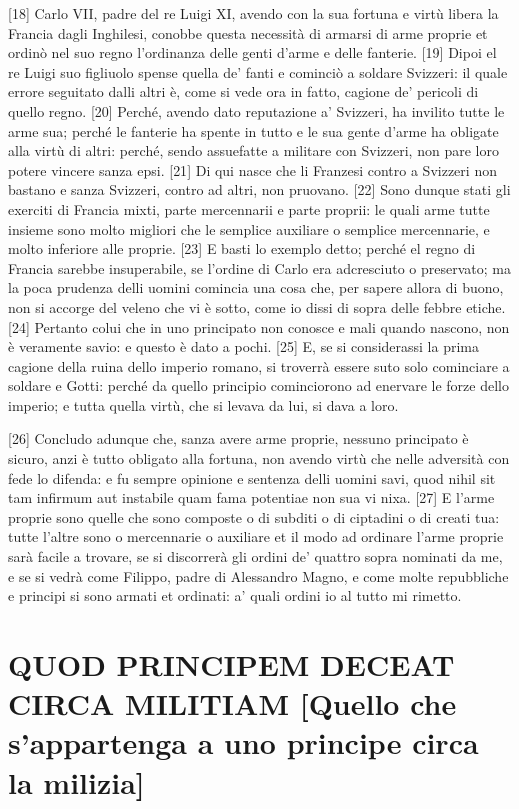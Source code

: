 {[}18{]} Carlo VII, padre del re Luigi XI, avendo con la sua fortuna e
virtù libera la Francia dagli Inghilesi, conobbe questa necessità di
armarsi di arme proprie et ordinò nel suo regno l'ordinanza delle genti
d'arme e delle fanterie. {[}19{]} Dipoi el re Luigi suo figliuolo spense
quella de' fanti e cominciò a soldare Svizzeri: il quale errore
seguitato dalli altri è, come si vede ora in fatto, cagione de' pericoli
di quello regno. {[}20{]} Perché, avendo dato reputazione a' Svizzeri,
ha invilito tutte le arme sua; perché le fanterie ha spente in tutto e
le sua gente d'arme ha obligate alla virtù di altri: perché, sendo
assuefatte a militare con Svizzeri, non pare loro potere vincere sanza
epsi. {[}21{]} Di qui nasce che li Franzesi contro a Svizzeri non
bastano e sanza Svizzeri, contro ad altri, non pruovano. {[}22{]} Sono
dunque stati gli exerciti di Francia mixti, parte mercennarii e parte
proprii: le quali arme tutte insieme sono molto migliori che le semplice
auxiliare o semplice mercennarie, e molto inferiore alle proprie.
{[}23{]} E basti lo exemplo detto; perché el regno di Francia sarebbe
insuperabile, se l'ordine di Carlo era adcresciuto o preservato; ma la
poca prudenza delli uomini comincia una cosa che, per sapere allora di
buono, non si accorge del veleno che vi è sotto, come io dissi di sopra
delle febbre etiche. {[}24{]} Pertanto colui che in uno principato non
conosce e mali quando nascono, non è veramente savio: e questo è dato a
pochi. {[}25{]} E, se si considerassi la prima cagione della ruina dello
imperio romano, si troverrà essere suto solo cominciare a soldare e
Gotti: perché da quello principio cominciorono ad enervare le forze
dello imperio; e tutta quella virtù, che si levava da lui, si dava a
loro.

{[}26{]} Concludo adunque che, sanza avere arme proprie, nessuno
principato è sicuro, anzi è tutto obligato alla fortuna, non avendo
virtù che nelle adversità con fede lo difenda: e fu sempre opinione e
sentenza delli uomini savi, quod nihil sit tam infirmum aut instabile
quam fama potentiae non sua vi nixa. {[}27{]} E l'arme proprie sono
quelle che sono composte o di subditi o di ciptadini o di creati tua:
tutte l'altre sono o mercennarie o auxiliare et il modo ad ordinare
l'arme proprie sarà facile a trovare, se si discorrerà gli ordini de'
quattro sopra nominati da me, e se si vedrà come Filippo, padre di
Alessandro Magno, e come molte repubbliche e principi si sono armati et
ordinati: a' quali ordini io al tutto mi rimetto.

\quebra\section{QUOD PRINCIPEM DECEAT CIRCA MILITIAM
{[}Quello che s'appartenga a uno principe circa la milizia{]}}

